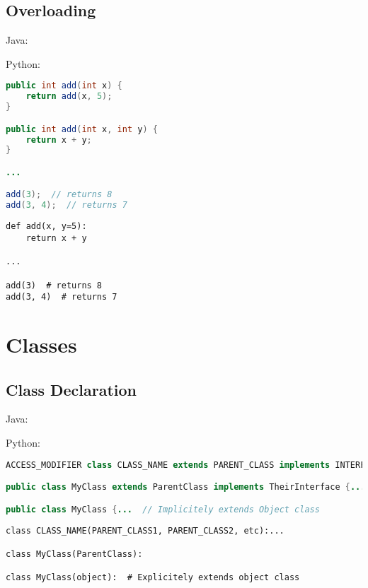 \documentclass{article}
\begin{document}
\subsection{Overloading}
\begin{minipage}{0.45\linewidth}
    Java:
\end{minipage}
\hfill
\begin{minipage}{0.45\linewidth}
    Python:
\end{minipage}

\begin{minipage}{0.45\linewidth}
    \begin{lstlisting}[language=Java]
public int add(int x) {
    return add(x, 5);
}

public int add(int x, int y) {
    return x + y;
}

...

add(3);  // returns 8
add(3, 4);  // returns 7
    \end{lstlisting}
\end{minipage}
\hfill
\begin{minipage}{0.45\linewidth}
    \begin{lstlisting}
def add(x, y=5):
    return x + y

...

add(3)  # returns 8
add(3, 4)  # returns 7
    \end{lstlisting}
\end{minipage}

\section{Classes}
\subsection{Class Declaration}
\begin{minipage}{0.45\linewidth}
    Java:
\end{minipage}
\hfill
\begin{minipage}{0.45\linewidth}
    Python:
\end{minipage}

\begin{minipage}{0.45\linewidth}
    \begin{lstlisting}[language=Java]
ACCESS_MODIFIER class CLASS_NAME extends PARENT_CLASS implements INTERFACES {...

public class MyClass extends ParentClass implements TheirInterface {...

public class MyClass {...  // Implicitely extends Object class
    \end{lstlisting}
\end{minipage}
\hfill
\begin{minipage}{0.45\linewidth}
    \begin{lstlisting}
class CLASS_NAME(PARENT_CLASS1, PARENT_CLASS2, etc):...

class MyClass(ParentClass):

class MyClass(object):  # Explicitely extends object class
    \end{lstlisting}
\end{minipage}
\end{document}
